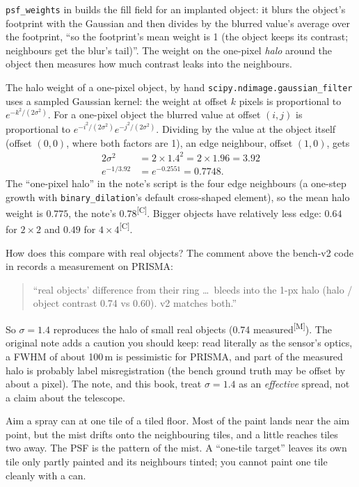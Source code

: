 \documentclass[11pt,a4paper,oneside,openany]{book}
\newcommand{\meas}{\textsuperscript{\textsf{\scriptsize[M]}}}
\newcommand{\comp}{\textsuperscript{\textsf{\scriptsize[C]}}}
\begin{document}
\texttt{psf\_weights} in  builds the fill field for an implanted object: it blurs the object's footprint with the
Gaussian and then divides by the blurred value's average over the footprint, ``so the footprint's mean weight is 1 (the object keeps
its contrast; neighbours get the blur's tail)''. The weight on the one-pixel \emph{halo} around the object then measures how much
contrast leaks into the neighbours.

\begin{worked}[label=we:halo]{The halo weight of a one-pixel object, by hand}
\texttt{scipy.ndimage.gaussian\_filter} uses a sampled Gaussian kernel: the weight at offset $k$ pixels is proportional to
$e^{-k^2/(2\sigma^2)}$. For a one-pixel object the blurred value at offset $(i,j)$ is proportional to
$e^{-i^2/(2\sigma^2)}e^{-j^2/(2\sigma^2)}$. Dividing by the value at the object itself (offset $(0,0)$, where both factors are 1),
an edge neighbour, offset $(1,0)$, gets
\begin{align*}
2\sigma^2 &= 2\times1.4^2=2\times1.96=3.92\\
e^{-1/3.92} &= e^{-0.2551}=0.7748 .
\end{align*}
The ``one-pixel halo'' in the note's script is the four edge neighbours (a one-step growth with \texttt{binary\_dilation}'s default
cross-shaped element), so the mean halo weight is $0.775$, the note's $0.78$\comp. Bigger objects have relatively less edge: $0.64$
for $2\times2$ and $0.49$ for $4\times4$\comp.
\end{worked}

How does this compare with real objects? The comment above the bench-v2 code in  records a measurement on PRISMA:
\begin{quote}\small
``real objects' difference from their ring \dots\ bleeds into the 1-px halo (halo / object contrast 0.74 vs 0.60). v2 matches both.''
\end{quote}
So $\sigma=1.4$ reproduces the halo of small real objects (0.74 measured\meas). The original note adds a caution you should keep:
read literally as the sensor's optics, a FWHM of about 100\,m is pessimistic for PRISMA, and part of the measured halo is probably
label misregistration (the bench ground truth may be offset by about a pixel). The note, and this book, treat $\sigma=1.4$ as an
\emph{effective} spread, not a claim about the telescope.

\begin{analogy}
Aim a spray can at one tile of a tiled floor. Most of the paint lands near the aim point, but the mist drifts onto the
neighbouring tiles, and a little reaches tiles two away. The PSF is the pattern of the mist. A ``one-tile target'' leaves its own
tile only partly painted and its neighbours tinted; you cannot paint one tile cleanly with a can.
\end{analogy}
\end{document}
